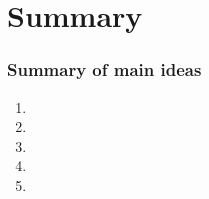 \documentclass[slidestop,compress,mathserif,12pt,t,professionalfonts,xcolor=table]{beamer}
\begin{document}

\begin{frame}
\frametitle{}

\vfill


\vfill

\end{frame}


\section{Summary}


\begin{frame}
\frametitle{Summary of main ideas}

\vfill

\begin{enumerate}

\item {}

\item {}

\item {}

\item {}

\item {}

\end{enumerate}

\vfill

\end{frame}

\end{document}
